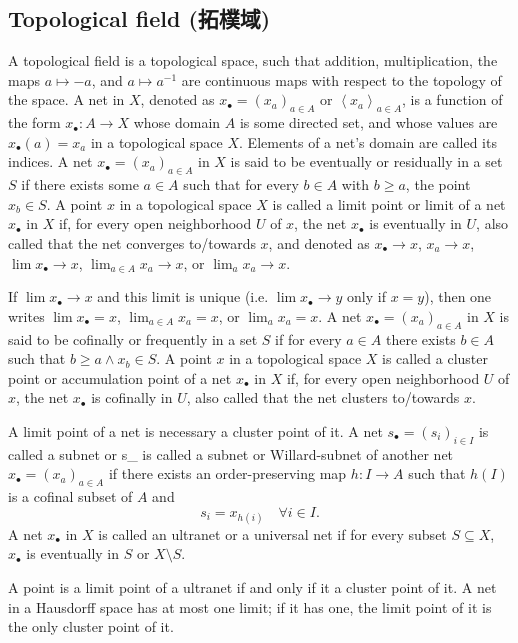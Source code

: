 \documentclass[a4paper,12pt]{article}
\begin{document}
\subsection{Topological field (拓樸域)}
A topological field is a topological space, such that addition, multiplication, the maps $a\mapsto -a$, and $a\mapsto a^{-1}$ are continuous maps with respect to the topology of the space.
A net in $X$, denoted as $x_{\bullet }=\left(x_{a}\right)_{a\in A}$ or $\left\langle x_{a}\right\rangle _{a\in A}$, is a function of the form $x_{\bullet }\colon A\to X$ whose domain $A$ is some directed set, and whose values are $x_{\bullet }(a)=x_{a}$ in a topological space $X$. Elements of a net's domain are called its indices.
A net $x_{\bullet }=\left(x_{a}\right)_{a\in A}$ in $X$ is said to be eventually or residually in a set $S$ if there exists some $a\in A$ such that for every $b\in A$ with $b\geq a$, the point $x_b\in S$.
A point $x$ in a topological space $X$ is called a limit point or limit of a net $x_{\bullet }$ in $X$ if, for every open neighborhood $U$ of $x$, the net $x_{\bullet }$ is eventually in $U$, also called that the net converges to/towards $x$, and denoted as $x_{\bullet}\to x$, $x_a\to x$, $\lim x_{\bullet}\to x$, $\lim_{a\in A}x_a\to x$, or $\lim_ax_a\to x$.

If $\lim x_{\bullet}\to x$ and this limit is unique (i.e. $\lim x_{\bullet}\to y$ only if $x=y$), then one writes $\lim x_{\bullet}=x$, $\lim_{a\in A}x_a=x$, or $\lim_ax_a=x$.
A net $x_{\bullet }=\left(x_{a}\right)_{a\in A}$ in $X$ is said to be cofinally or frequently in a set $S$ if for every $a\in A$ there exists $b\in A$ such that $b\geq a\land x_b\in S$.
A point $x$ in a topological space $X$ is called a cluster point or accumulation point of a net $x_{\bullet }$ in $X$ if, for every open neighborhood $U$ of $x$, the net $x_{\bullet }$ is cofinally in $U$, also called that the net clusters to/towards $x$.

A limit point of a net is necessary a cluster point of it.
A net $s_{\bullet }=\left(s_{i}\right)_{i\in I}$ is called a subnet or 
{\displaystyle s_{\bullet }} is called a subnet or Willard-subnet of another net $x_{\bullet }=\left(x_{a}\right)_{a\in A}$ if there exists an order-preserving map $h\colon I\to A$ such that $h(I)$ is a cofinal subset of $A$ and 
\[s_{i}=x_{h(i)}\quad \forall i\in I.\]
A net $x_{\bullet }$ in $X$ is called an ultranet or a universal net if for every subset $S\subseteq X$, $x_{\bullet }$ is eventually in $S$ or $X\setminus S$.

A point is a limit point of a ultranet if and only if it a cluster point of it.
A net in a Hausdorff space has at most one limit; if it has one, the limit point of it is the only cluster point of it.
\end{document}
